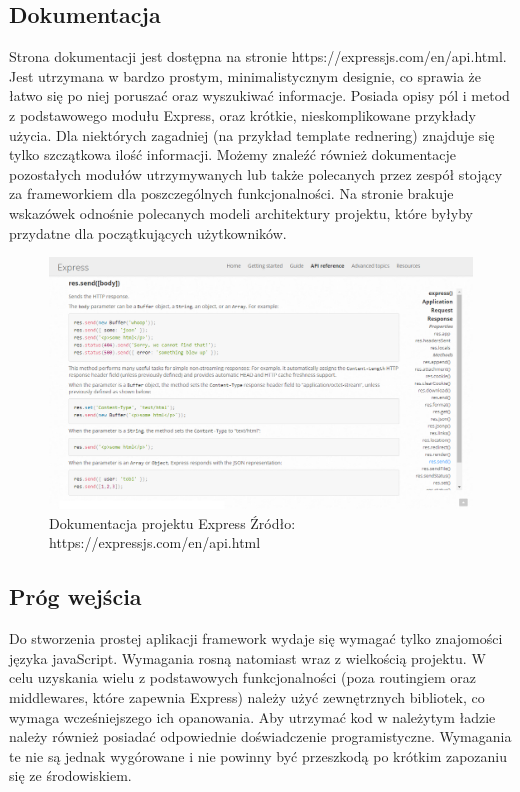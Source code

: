 \documentclass[12pt]{report}
\begin{document}
    \subsection{Dokumentacja}
      Strona dokumentacji jest dostępna na stronie https://expressjs.com/en/api.html.
      Jest utrzymana w bardzo prostym, minimalistycznym designie, co sprawia że łatwo się po niej poruszać oraz wyszukiwać informacje.
      Posiada opisy pól i metod z podstawowego modułu Express, oraz krótkie, nieskomplikowane przykłady użycia.
      Dla niektórych zagadniej (na przykład template rednering) znajduje się tylko szczątkowa ilość informacji.
      Możemy znaleźć również dokumentacje pozostałych modułów utrzymywanych lub także polecanych przez zespół stojący za frameworkiem dla poszczególnych funkcjonalności.
      Na stronie brakuje wskazówek odnośnie polecanych modeli architektury projektu, które byłyby przydatne dla początkujących użytkowników.
      \begin{figure}[!hb]
        \centering
        \includegraphics[width=\textwidth,height=\textheight,keepaspectratio]{doc_express.png} 
        \caption{Dokumentacja projektu Express \newline Źródło: https://expressjs.com/en/api.html}
      \end{figure}

    \subsection{Próg wejścia}
      Do stworzenia prostej aplikacji framework wydaje się wymagać tylko znajomości języka javaScript.
      Wymagania rosną natomiast wraz z wielkością projektu.
      W celu uzyskania wielu z podstawowych funkcjonalności (poza routingiem oraz middlewares, które zapewnia Express) należy użyć zewnętrznych bibliotek, co wymaga wcześniejszego ich opanowania. 
      Aby utrzymać kod w należytym ładzie należy również posiadać odpowiednie doświadczenie programistyczne.
      Wymagania te nie są jednak wygórowane i nie powinny być przeszkodą po krótkim zapozaniu się ze środowiskiem.
\end{document}
